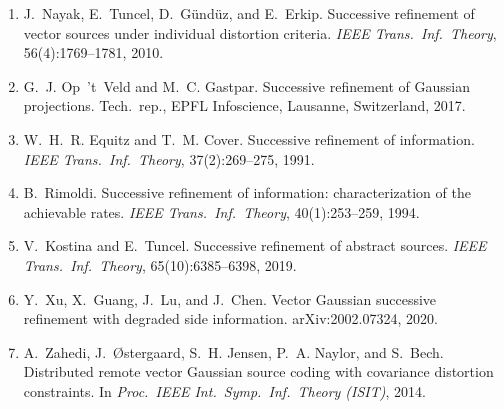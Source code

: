 \documentclass[lettersize,onecolumn]{IEEEtran}
\theoremstyle{definition}
\theoremstyle{remark}
\begin{document}
\begin{enumerate}
\item  J.~Nayak, E.~Tuncel, D.~G\"und\"uz, and E.~Erkip. Successive
refinement of vector sources under individual distortion criteria. \emph{IEEE Trans.\
Inf.\ Theory}, 56(4):1769--1781, 2010.
\item  G.~J. Op~'t~Veld and M.~C. Gastpar. Successive refinement of Gaussian
projections. Tech.\ rep., EPFL Infoscience, Lausanne, Switzerland, 2017.
\item  W.~H.~R. Equitz and T.~M. Cover. Successive refinement of
information. \emph{IEEE Trans.\ Inf.\ Theory}, 37(2):269--275, 1991.
\item  B.~Rimoldi. Successive refinement of information: characterization of
the achievable rates. \emph{IEEE Trans.\ Inf.\ Theory}, 40(1):253--259, 1994.
\item  V.~Kostina and E.~Tuncel. Successive refinement of abstract
sources. \emph{IEEE Trans.\ Inf.\ Theory}, 65(10):6385--6398, 2019.
\item  Y.~Xu, X.~Guang, J.~Lu, and J.~Chen. Vector Gaussian successive refinement
with degraded side information. arXiv:2002.07324, 2020.
\item  A.~Zahedi, J.~\O{}stergaard, S.~H. Jensen, P.~A. Naylor, and S.~Bech.
Distributed remote vector Gaussian source coding with covariance distortion constraints.
In \emph{Proc.\ IEEE Int.\ Symp.\ Inf.\ Theory (ISIT)}, 2014.
\end{enumerate}
\end{document}
